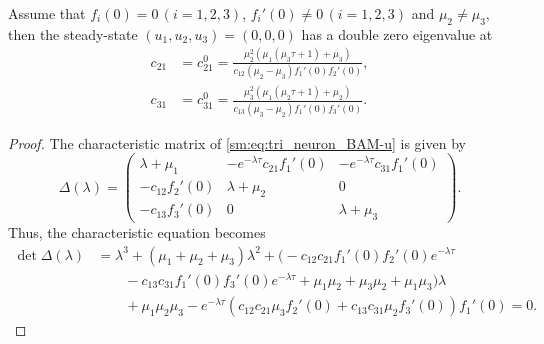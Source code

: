 \begin{lemma}
\label{sm:lem:BAM_double_eigenvalue}
Assume that $f_{i}(0)=0\,(i=1,2,3)$, $f_{i}'(0)\neq0\,(i=1,2,3)$ and
$\mu_{2}\neq\mu_{3}$, then the steady-state $(u_{1},u_{2},u_{3})=(0,0,0)$ has a
double zero eigenvalue at 
\begin{align*}
c_{21} & =c_{21}^{0}=\frac{\mu_{2}^{2}\left(\mu_{1}\left(\mu_{3}\tau+1\right)+\mu_{3}\right)}{c_{12}\left(\mu_{2}-\mu_{3}\right)f_{1}'(0)f_{2}'(0)},\\
c_{31} & =c_{31}^{0}=\frac{\mu_{3}^{2}\left(\mu_{1}\left(\mu_{2}\tau+1\right)+\mu_{2}\right)}{c_{13}\left(\mu_{3}-\mu_{2}\right)f_{1}'(0)f_{3}'(0)}.
\end{align*}
\end{lemma}
\begin{proof}
The characteristic matrix of \cref{sm:eq:tri_neuron_BAM-u} is given
by
\[
\Delta(\lambda)=\left(\begin{array}{ccc}
\lambda+\mu_{1} & -e^{-\lambda\tau}c_{21}f_{1}'(0) & -e^{-\lambda\tau}c_{31}f_{1}'(0)\\
-c_{12}f_{2}'(0) & \lambda+\mu_{2} & 0\\
-c_{13}f_{3}'(0) & 0 & \lambda+\mu_{3}

\end{array}\right).
\]
Thus, the characteristic equation becomes 
\begin{align}
\det\Delta(\lambda) & =\lambda^{3}+\left(\mu_{1}+\mu_{2}+\mu_{3}\right)\lambda^{2}+\big(-c_{12}c_{21}f_{1}'(0)f_{2}'(0)e^{-\lambda\tau}\nonumber \\
 & \qquad-c_{13}c_{31}f_{1}'(0)f_{3}'(0)e^{-\lambda\tau}+\mu_{1}\mu_{2}+\mu_{3}\mu_{2}+\mu_{1}\mu_{3}\big)\lambda\nonumber \\
 & \qquad+\mu_{1}\mu_{2}\mu_{3}-e^{-\lambda\tau}\left(c_{12}c_{21}\mu_{3}f_{2}'(0)+c_{13}c_{31}\mu_{2}f_{3}'(0)\right)f_{1}'(0)=0.\label{sm:eq:BAM_characteristic_eq}
\end{align}


\end{proof}

